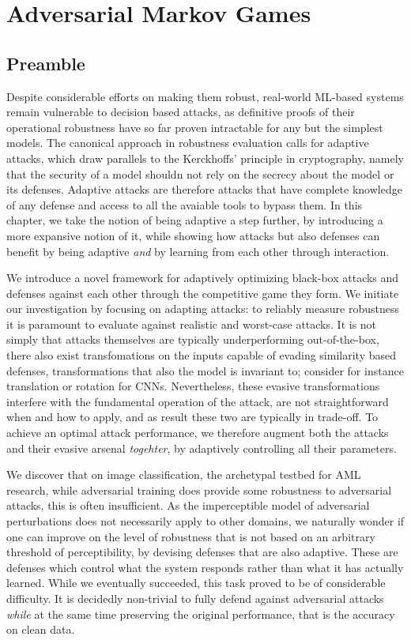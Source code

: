 \chapter{Adversarial Markov Games}\label{ch:markovgames}

\section*{Preamble}

Despite considerable efforts on making them robust, real-world ML-based systems remain vulnerable to decision based attacks, as definitive proofs of their operational robustness have so far proven intractable for any but the simplest models.
The canonical approach in robustness evaluation calls for adaptive attacks, which draw parallels to the Kerckhoffs' principle in cryptography, namely that the security of a model shouldn not rely on the secrecy about the model or its defenses. 
Adaptive attacks are therefore attacks that have complete knowledge of any defense and access to all the avaiable tools to bypass them.
In this chapter, we take the notion of being adaptive a step further, by introducing a more expansive notion of it, while showing how attacks but also defenses can benefit by being adaptive \emph{and} by learning from each other through interaction.

We introduce a novel framework for adaptively optimizing black-box attacks and defenses against each other through the competitive game they form.
We initiate our investigation by focusing on adapting attacks: to reliably measure robustness it is paramount to evaluate against realistic and worst-case attacks.
It is not simply that attacks themselves are typically underperforming out-of-the-box, there also exist transfomations on the inputs capable of evading similarity based defenses, transformations that also the model is invariant to; consider for instance translation or rotation for \gls{CNN}s.
Nevertheless, these evasive transformations interfere with the fundamental operation of the attack, are not straightforward when and how to apply, and as result these two are typically in trade-off.
To achieve an optimal attack performance, we therefore augment both the attacks and their evasive arsenal \textit{togehter}, by adaptively controlling all their parameters.

We discover that on image classification, the archetypal testbed for \gls{AML} research, while adversarial training does provide some robustness to adversarial attacks, this is often insufficient.
As the imperceptible model of adversarial perturbations does not necessarily apply to other domains, we naturally wonder if one can improve on the level of robustness that is not based on an arbitrary threshold of perceptibility, by devising defenses that are also adaptive.
These are defenses which control what the system responds rather than what it has actually learned.
While we eventually succeeded, this task proved to be of considerable difficulty.
It is decidedly non-trivial to fully defend against adversarial attacks \textit{while} at the same time preserving the original performance, that is the accuracy on clean data.

